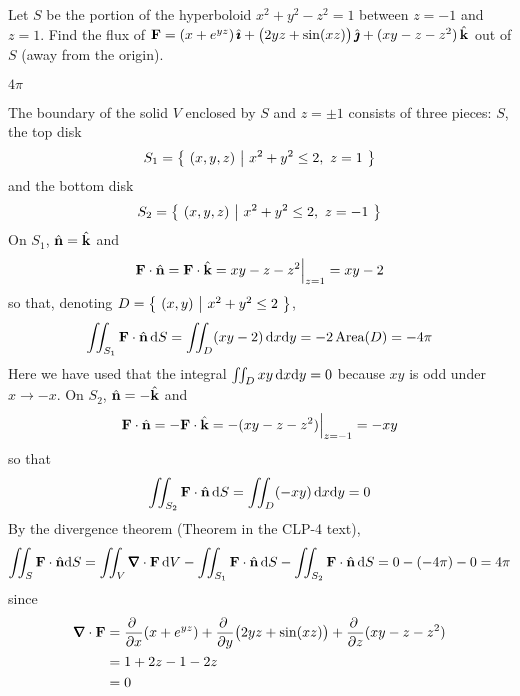 \begin{question}[M317 2003A] %
Let $S$ be the portion of the hyperboloid $x^2 + y^2 -z^2 = 1$ 
between $z=-1$ and $z=1$. Find the flux of 
$\mathbf{F} = (x+e^{yz})\,\hat{\pmb{\imath}} +\big(2yz+\sin(xz)\big)\,\hat{\pmb{\jmath}} +(xy-z-z^2)\,\hat{\mathbf{k}}$ 
out of $S$ (away from the origin).
\end{question}


\begin{answer} 
$4\pi$
\end{answer}

\begin{solution} 
The boundary of the solid $V$ enclosed by $S$ and $z= \pm 1$ consists 
of three pieces: $S$, the top disk 
\begin{equation*}
S_1=\big\{ \ (x,y,z)\ \big|\ x^2 + y^2 \le 2,\ z= 1\ \big\}
\end{equation*} 
and the bottom disk 
\begin{equation*}
S_2=\big\{ \ (x,y,z)\ \big|\ x^2 + y^2 \le 2,\ z= -1\ \big\}
\end{equation*}
On $S_1$, $\hat{\mathbf{n}}=\hat{\mathbf{k}}$ and 
\begin{equation*}
\mathbf{F}\cdot\hat{\mathbf{n}}=\mathbf{F}\cdot\hat{\mathbf{k}}=xy-z-z^2\Big|_{z=1}= xy-2
\end{equation*} so that,
denoting $D=\big\{ \ (x,y)\ \big|\ x^2+y^2 \le 2\ \big\}$,
$$
\iint_{S_1} \mathbf{F} \cdot \hat{\mathbf{n}}\, \mathrm{d}S 
   = \iint_D (xy -2) \,\mathrm{d}x\mathrm{d}y 
   =-2\,\text{Area}(D)= - 4 \pi
$$
Here we have used that the integral $\iint_D xy \,\mathrm{d}x\mathrm{d}y=0$
because $xy$ is odd under $x\rightarrow -x$.
On $S_2$, $\hat{\mathbf{n}}=-\hat{\mathbf{k}}$ and 
\begin{equation*}
\mathbf{F}\cdot\hat{\mathbf{n}}=-\mathbf{F}\cdot\hat{\mathbf{k}}= -(xy-z-z^2)\Big|_{z=-1}=-xy
\end{equation*} 
so that
$$
\iint_{S_2} \mathbf{F} \cdot \hat{\mathbf{n}}\, \mathrm{d}S = \iint_D (- xy)\,  \mathrm{d}x\mathrm{d}y = 0
$$
By the divergence theorem (Theorem  in 
the CLP-4 text),
\begin{align*}
\dblInt_S \vF \cdot \hn \dee{S} 
= \dblInt_V \vnabla\cdot\vF\, \dee{V} - 
 \dblInt_{S_1} \vF \cdot \hn\, \dee{S}
- \dblInt_{S_2} \vF \cdot \hn\, \dee{S} = 0 -(- 4 \pi) - 0 
= 4\pi
\end{align*}
since 
\begin{align*}
\vnabla\cdot\vF &= 
    \pdiff{}{x}(x+e^{yz})
     +\pdiff{}{y}\big(2yz+\sin(xz)\big)
     +\pdiff{}{z}(xy-z-z^2) \\
   &=   1 + 2z -1 -2z \\
   &=0
\end{align*}
\end{solution}

